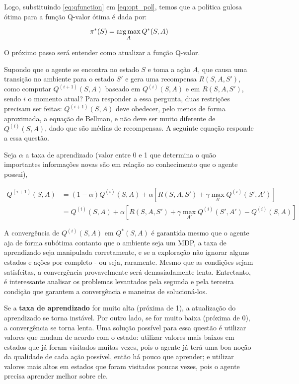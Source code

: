 Logo, substituindo \ref{eq:qfunction} em \ref{eq:opt_pol}, temos que a política gulosa ótima para a função Q-valor ótima é dada por:

\begin{equation} \label{eq:q_opt_pol}
\pi^{*}(S) = \operatorname*{arg\,max}_{A}Q^{*}(S,A)
\end{equation}

O próximo passo será entender como atualizar a função Q-valor.

Supondo que o agente se encontra no estado $S$ e toma a ação $A$, que causa uma transição no ambiente para o estado $S'$ e gera uma recompensa $R(S,A,S')$, como computar $Q^{(i+1)}(S,A)$ baseado em $Q^{(i)}(S,A)$ e em $R(S,A,S')$, sendo $i$ o momento atual?
Para responder a essa pergunta, duas restrições precisam ser feitas: $Q^{(i+1)}(S,A)$ deve obedecer, pelo menos de forma aproximada, a equação de Bellman, e não deve ser muito diferente de $Q^{(i)}(S,A)$, dado que são médias de recompensas.
A seguinte equação responde a essa questão.

Seja $\alpha$ a taxa de aprendizado (valor entre 0 e 1 que determina o quão importantes informações novas são em relação ao conhecimento que o agente possui),

\begin{equation} \label{eq:q_update}
\begin{align*}
Q^{(i+1)}(S,A) &= (1-\alpha)Q^{(i)}(S,A) + \alpha[R(S,A,S') + \gamma \max_{A'}Q^{(i)}(S',A')] \\
            &= Q^{(i)}(S,A) + \alpha[R(S,A,S') + \gamma \max_{A'}Q^{(i)}(S',A') - Q^{(i)}(S,A)]
\end{align*}
\end{equation}

A convergência de $Q^{(i)}(S,A)$ em $Q^{*}(S,A)$ é garantida mesmo que o agente aja de forma subótima contanto que o ambiente seja um MDP, a taxa de aprendizado seja manipulada corretamente, e se a exploração não ignorar alguns estados e ações por completo - ou seja, raramente.
Mesmo que as condições sejam satisfeitas, a convergência provavelmente será demasiadamente lenta.
Entretanto, é interessante analisar os problemas levantados pela segunda e pela terceira condição que garantem a convergência e maneiras de solucioná-los.

Se a \textbf{taxa de aprendizado} for muito alta (próxima de 1), a atualização do aprendizado se torna instável.
Por outro lado, se for muito baixa (próxima de 0), a convergência se torna lenta.
Uma solução possível para essa questão é utilizar valores que mudam de acordo com o estado: utilizar valores mais baixos em estados que já foram visitados muitas vezes, pois o agente já terá uma boa noção da qualidade de cada ação possível, então há pouco que aprender; e utilizar valores mais altos em estados que foram visitados poucas vezes, pois o agente precisa aprender melhor sobre ele.

